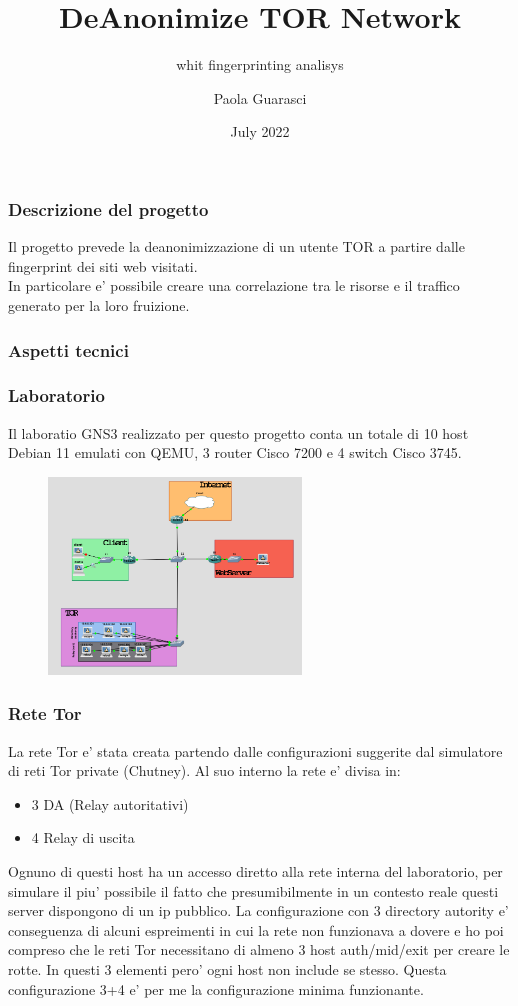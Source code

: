 \documentclass{beamer}[10pt]
\title[DeAnonTor]{DeAnonimize TOR Network}
\subtitle[]{whit fingerprinting analisys}
\author[Paola Guarasci]{Paola Guarasci}
\date[06/2022]{July 2022}
\begin{document}
\frame{\titlepage}

\begin{frame}
  \frametitle{Descrizione del progetto}
  Il progetto prevede la deanonimizzazione di un utente TOR a partire dalle fingerprint dei siti web visitati. \\ In particolare e' possibile creare una correlazione tra le risorse e il traffico generato per la loro fruizione.

\end{frame}

\begin{frame}
  \frametitle{Aspetti tecnici}
\end{frame}

\begin{frame}
  \frametitle{Laboratorio}
  Il laboratio GNS3 realizzato per questo progetto conta un totale di 10 host Debian 11 emulati con QEMU, 3 router Cisco 7200 e 4 switch Cisco 3745.
  \begin{figure}
    \centering
    \includegraphics[width=0.60\textwidth]{../img/topology.png}
  \end{figure}

\end{frame}

\begin{frame}
  \frametitle{Rete Tor}
  La rete Tor e' stata creata partendo dalle configurazioni suggerite dal simulatore di reti Tor private (Chutney). Al suo interno la rete e' divisa in:
  \begin{itemize}
    \item 3 DA (Relay autoritativi)
    \item 4 Relay di uscita
  \end{itemize}
  Ognuno di questi host ha un accesso diretto alla rete interna del laboratorio, per simulare il piu' possibile il fatto che presumibilmente in un contesto reale questi server dispongono di un ip pubblico.
  La configurazione con 3 directory autority e' conseguenza di alcuni espreimenti in cui la rete non funzionava a dovere e ho poi compreso che le reti Tor necessitano di almeno 3 host auth/mid/exit per creare le rotte. In questi 3 elementi pero' ogni host non include se stesso. Questa configurazione 3+4 e' per me la configurazione minima funzionante.
\end{frame}
\end{document}

